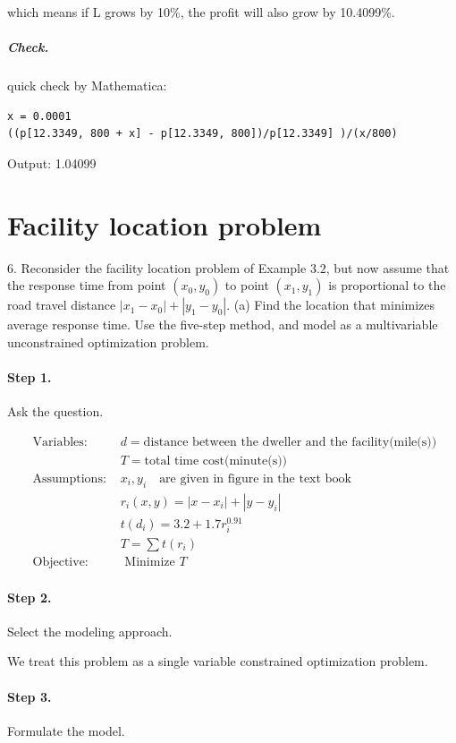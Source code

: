 \documentclass[11pt]{article}
\begin{document}
which means if L grows by 10\%, the profit will also grow by 10.4099\%.

\subparagraph{Check.} quick check by Mathematica:
\begin{lstlisting}
x = 0.0001
((p[12.3349, 800 + x] - p[12.3349, 800])/p[12.3349] )/(x/800)
\end{lstlisting}

Output: 1.04099

\section{Facility location problem}
6. Reconsider the facility location problem of Example $3.2$, but now assume that the response time from point $\left(x_{0}, y_{0}\right)$ to point $\left(x_{1}, y_{1}\right)$ is proportional to the road travel distance $\left|x_{1}-x_{0}\right|+\left|y_{1}-y_{0}\right|$.
(a) Find the location that minimizes average response time. Use the five-step method, and model as a multivariable unconstrained optimization problem.
\paragraph{Step 1.} Ask the question.

$$
\begin{array}{ll}
\text { Variables: } 
& d = \text{distance between the dweller and the facility(mile(s))}\\
& T = \text{total time cost(minute(s))} \\
\text { Assumptions: } 
& x_i,y_i \quad \text{are given in figure in the text book}\\
& r_i(x,y) = |x-x_i| + |y-y_i| \\
& t(d_i) =   3.2 + 1.7r_i ^{0.91}\\
& T = \sum t(r_i) \\
\text { Objective: } \quad & \text { Minimize } T
\end{array}
$$

 \paragraph{Step 2.} Select the modeling approach.
 
 We treat this problem as a single variable constrained optimization problem.
 
\paragraph{Step 3.} Formulate the model.
\end{document}
